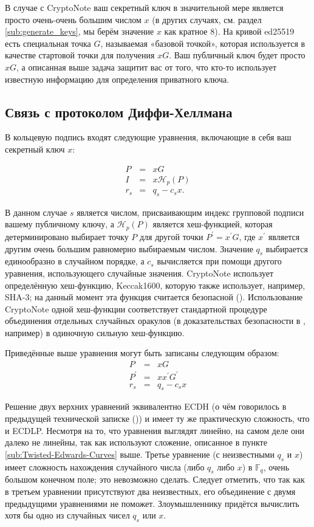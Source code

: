 \documentclass{mrl}
\numberwithin{equation}{section}
\numberwithin{figure}{section}
\begin{document}
В случае с CryptoNote ваш секретный ключ в значительной мере является просто очень-очень большим числом $x$ (в других случаях, см. раздел \ref{sub:generate_keys}, мы берём значение $x$ как кратное $8$). На кривой ed25519 есть специальная точка $G$, называемая «базовой точкой», которая используется в качестве стартовой точки для получения $xG$. Ваш публичный ключ будет просто $xG$, а описанная выше задача защитит вас от того, что кто-то использует известную информацию для определения приватного ключа.

\subsection{\label{sub:Relation-to-Diffie}Связь с протоколом Диффи-Хеллмана}

В кольцевую подпись входят следующие уравнения, включающие в себя ваш секретный ключ $x$:

\begin{eqnarray*}
P&=&xG \\
I&=&x\mathcal{H}_{p}\left(P\right) \\
r_{s}&=&q_{s}-c_{s}x.
\end{eqnarray*}

В данном случае $s$ является числом, присваивающим индекс групповой подписи вашему публичному ключу, а $\mathcal{H}_{p}\left(P\right)$ является хеш-функцией, которая детерминировано выбирает точку $P$ для другой точки $P^{\prime}=x^{\prime}G$, где $x^{\prime}$ является другим очень большим равномерно выбираемым числом. Значение $q_s$ выбирается единообразно в случайном порядке, а $c_s$ вычисляется при помощи другого уравнения, использующего случайные значения. CryptoNote использует определённую хеш-функцию, Keccak1600, которую также использует, например, SHA-3; на данный момент эта функция считается безопасной (\cite{FIPS}). Использование CryptoNote одной хеш-функции соответствует стандартной процедуре объединения отдельных случайных оракулов (в доказательствах безопасности в \cite{FS}, например) в одиночную сильную хеш-функцию.

Приведённые выше уравнения могут быть записаны следующим образом:
\begin{eqnarray*}
P&=&xG \\
P^{\prime}&=&xx^{\prime}G^{\prime} \\
r_{s}&=&q_{s}-c_{s}x
\end{eqnarray*}

Решение двух верхних уравнений эквивалентно ECDH (о чём говорилось в предыдущей технической записке (\cite{SN})) и имеет ту же практическую сложность, что и ECDLP. Несмотря на то, что уравнения выглядят линейно, на самом деле они далеко не линейны, так как используют сложение, описанное в пункте \ref{sub:Twisted-Edwards-Curves} выше. Третье уравнение (с неизвестными $q_{s}$ и $x$) имеет сложность нахождения случайного числа (либо $q_{s}$ либо $x$) в $\mathbb{F}_{q}$, очень большом конечном поле; это невозможно сделать. Следует отметить, что так как в третьем уравнении присутствуют два неизвестных, его объединение с двумя предыдущими уравнениями не поможет. Злоумышленнику придётся вычислить хотя бы одно из случайных чисел $q_{s}$ или $x$.
\end{document}
